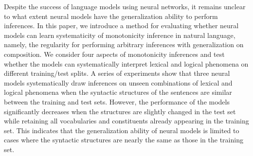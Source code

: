 Despite the success of language models using neural networks, it remains unclear to what extent neural models have the generalization ability to perform inferences. In this paper, we introduce a method for evaluating whether neural models can learn systematicity of monotonicity inference in natural language, namely, the regularity for performing arbitrary inferences with generalization on composition. We consider four aspects of monotonicity inferences and test whether the models can systematically interpret lexical and logical phenomena on different training/test splits. A series of experiments show that three neural models systematically draw inferences on unseen combinations of lexical and logical phenomena when the syntactic structures of the sentences are similar between the training and test sets. However, the performance of the models significantly decreases when the structures are slightly changed in the test set while retaining all vocabularies and constituents already appearing in the training set. This indicates that the generalization ability of neural models is limited to cases where the syntactic structures are nearly the same as those in the training set.
